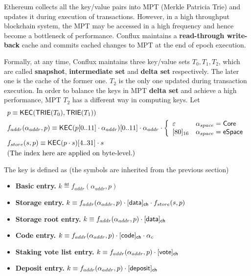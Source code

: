 Ethereum collects all the key/value pairs into MPT (Merkle Patricia Trie) and updates it during execution of transactions. However, in a high throughput blockchain system, the MPT may be accessed in a high frequency and hence become a bottleneck of performance. Conflux maintains a \textbf{read-through write-back} cache and commits cached changes to MPT at the end of epoch execution. 

Formally, at any time, Conflux maintains three key/value sets $T_0,T_1,T_2$, which are called {\bf snapshot}, {\bf intermediate set} and {\bf delta set} respectively. The later one is the cache of the former one. $T_2$ is the only one updated during transaction execution. In order to balance the keys in MPT {\bf delta set} and achieve a high performance, MPT $T_2$ has a different way in computing keys. Let 
%
\begin{align}
	&p\equiv\mathsf{KEC}(\mathsf{TRIE}(T_0),\mathsf{TRIE}(T_1)) \\
	&f_{addr}(\alpha_{addr},p)\equiv\mathsf{KEC}(p[0..11]\cdot \alpha_{addr})[0..11]\cdot \alpha_{addr}\cdot
	\left\{\begin{array}{ll}
		\varepsilon & \alpha_{space} = \mathsf{Core} \\ 
		\text{}[80]_{16} & \alpha_{space}=\mathsf{eSpace}
	\end{array}\right.\\
	&f_{store}(s,p)\equiv \mathsf{KEC}(p\cdot s)[4..31]\cdot s\\
	&\text{(The index here are applied on byte-level.)} \notag
\end{align}

The key is defined as (the symbols are inherited from the previous section)
\begin{itemize}[nosep]
	\item {\bf Basic entry.} $k\eqdef f_{addr}(\alpha_{addr},p)$
	\item {\bf Storage entry.} $k\equiv f_{addr}(\alpha_{addr},p)\cdot [{\sf data}]_{\sf ch}\cdot f_{store}(s,p)$
	\item {\bf Storage root entry.} $k\equiv f_{addr}(\alpha_{addr},p)\cdot [{\sf data}]_{\sf ch}$
	\item {\bf Code entry.} $k\equiv f_{addr}(\alpha_{addr},p)\cdot [{\sf code}]_{\sf ch}\cdot \alpha_c$
	\item {\bf Staking vote list entry.} $k\equiv f_{addr}(\alpha_{addr},p)\cdot [{\sf vote}]_{\sf ch}$
	\item {\bf Deposit entry.} $k\equiv f_{addr}(\alpha_{addr},p)\cdot [{\sf deposit}]_{\sf ch}$
 
\end{itemize}

